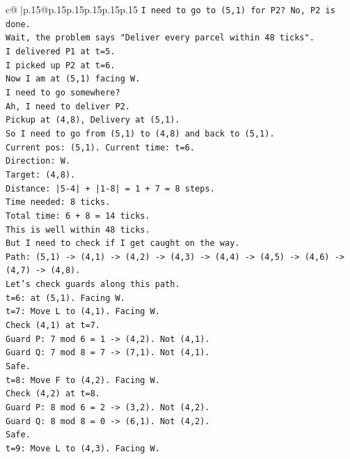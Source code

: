\documentclass{article}
\begin{document}
{\begin{supertabular}{c@{$\;$}|p{.15\linewidth}@{}p{.15\linewidth}p{.15\linewidth}p{.15\linewidth}p{.15\linewidth}p{.15\linewidth}}
{{{\texttt{I need to go to (5,1) for P2? No, P2 is done.} \\
\texttt{Wait, the problem says "Deliver every parcel within 48 ticks".} \\
\texttt{I delivered P1 at t=5.} \\
\texttt{I picked up P2 at t=6.} \\
\texttt{Now I am at (5,1) facing W.} \\
\texttt{I need to go somewhere?} \\
\texttt{Ah, I need to deliver P2.} \\
\texttt{Pickup at (4,8), Delivery at (5,1).} \\
\texttt{So I need to go from (5,1) to (4,8) and back to (5,1).} \\
\texttt{Current pos: (5,1). Current time: t=6.} \\
\texttt{Direction: W.} \\
\texttt{Target: (4,8).} \\
\texttt{Distance: |5{-}4| + |1{-}8| = 1 + 7 = 8 steps.} \\
\texttt{Time needed: 8 ticks.} \\
\texttt{Total time: 6 + 8 = 14 ticks.} \\
\texttt{This is well within 48 ticks.} \\
\texttt{But I need to check if I get caught on the way.} \\
\texttt{Path: (5,1) {-}> (4,1) {-}> (4,2) {-}> (4,3) {-}> (4,4) {-}> (4,5) {-}> (4,6) {-}> (4,7) {-}> (4,8).} \\
\texttt{Let's check guards along this path.} \\
\texttt{t=6: at (5,1). Facing W.} \\
\texttt{t=7: Move L to (4,1). Facing W.} \\
\texttt{Check (4,1) at t=7.} \\
\texttt{Guard P: 7 mod 6 = 1 {-}> (4,2). Not (4,1).} \\
\texttt{Guard Q: 7 mod 8 = 7 {-}> (7,1). Not (4,1).} \\
\texttt{Safe.} \\
\texttt{t=8: Move F to (4,2). Facing W.} \\
\texttt{Check (4,2) at t=8.} \\
\texttt{Guard P: 8 mod 6 = 2 {-}> (3,2). Not (4,2).} \\
\texttt{Guard Q: 8 mod 8 = 0 {-}> (6,1). Not (4,2).} \\
\texttt{Safe.} \\
\texttt{t=9: Move L to (4,3). Facing W.} \\
}}}
\end{supertabular}}
\end{document}
